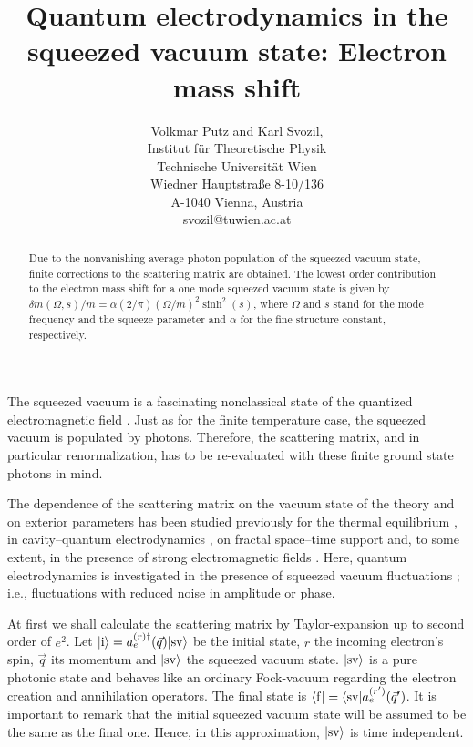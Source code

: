 
\title{Quantum electrodynamics in the squeezed vacuum state:
Electron mass shift}
\author{
  Volkmar Putz and Karl Svozil,\\
  {\small Institut f\"ur Theoretische Physik}  \\
  {\small Technische Universit\"at Wien   }     \\
  {\small Wiedner Hauptstra\ss e 8-10/136}    \\
  {\small A-1040 Vienna, Austria   }            \\
  {\small svozil@tuwien.ac.at}}
\maketitle
\begin{abstract}
Due to the nonvanishing average photon population of the squeezed vacuum
state, finite corrections to the scattering matrix are obtained.  The
lowest order contribution to the electron mass shift for a one mode
squeezed vacuum state is given by $\delta m(\Omega ,s)/m=\alpha (2/\pi
)(\Omega /m)^2\sinh^2(s)$, where $\Omega$ and $s$ stand for the mode
frequency and the squeeze parameter and $\alpha$ for the fine structure
constant, respectively.
\end{abstract}


The squeezed vacuum is a fascinating nonclassical state of the
quantized electromagnetic field \cite{loudon}.
Just as for the finite temperature case,
the squeezed vacuum is populated by
photons.
Therefore, the scattering matrix, and in particular renormalization,
has to be re-evaluated with these finite ground state photons in mind.

The dependence of the scattering matrix on the vacuum state
of the theory and on exterior parameters has been studied previously for the
 thermal
equilibrium \cite{thermal}, in cavity--quantum
electrodynamics \cite{cavity-qed},
on fractal space--time support \cite{zei-svo}
and, to some extent, in the presence of strong electromagnetic
fields \cite{greiner,strongfield-qed}.
Here, quantum electrodynamics
is investigated
in the presence of squeezed vacuum fluctuations \cite{milburn}; i.e.,
 fluctuations with reduced noise in amplitude or phase.

At first we shall calculate the scattering matrix by Taylor-expansion up to
second order of $e^{2}$. Let $\vert{\rm i}\rangle =
a_{e}^{(r)\dagger}(\vec q)\vert{\rm sv}\rangle$ be the initial state, $r$ the incoming
electron's spin, $\vec q$ its momentum and $\vert{\rm sv}\rangle$ the squeezed
vacuum state. $\vert{\rm sv}\rangle$  is a pure photonic state and behaves like an ordinary
Fock-vacuum regarding the electron creation and annihilation operators.
The final state is $\langle{\rm f}\vert =
\langle{\rm sv}\vert a_{e}^{(r')}(\vec q')$. It is important to remark that
the initial squeezed vacuum state will be assumed to be the same as the final
one. Hence, in this approximation, $\vert{\rm sv}\rangle$ is time independent.

